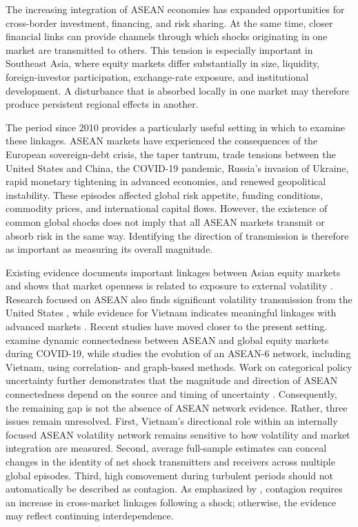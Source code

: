 \documentclass[12pt,a4paper]{article}
\begin{document}
The increasing integration of ASEAN economies has expanded opportunities for cross-border investment, financing, and risk sharing. At the same time, closer financial links can provide channels through which shocks originating in one market are transmitted to others. This tension is especially important in Southeast Asia, where equity markets differ substantially in size, liquidity, foreign-investor participation, exchange-rate exposure, and institutional development. A disturbance that is absorbed locally in one market may therefore produce persistent regional effects in another.

The period since 2010 provides a particularly useful setting in which to examine these linkages. ASEAN markets have experienced the consequences of the European sovereign-debt crisis, the taper tantrum, trade tensions between the United States and China, the COVID-19 pandemic, Russia's invasion of Ukraine, rapid monetary tightening in advanced economies, and renewed geopolitical instability. These episodes affected global risk appetite, funding conditions, commodity prices, and international capital flows. However, the existence of common global shocks does not imply that all ASEAN markets transmit or absorb risk in the same way. Identifying the direction of transmission is therefore as important as measuring its overall magnitude.

Existing evidence documents important linkages between Asian equity markets and shows that market openness is related to exposure to external volatility \citep{Chow2017}. Research focused on ASEAN also finds significant volatility transmission from the United States \citep{VoTran2020}, while evidence for Vietnam indicates meaningful linkages with advanced markets \citep{VoEllis2018}. Recent studies have moved closer to the present setting. \citet{SethapramoteEtAl2023} examine dynamic connectedness between ASEAN and global equity markets during COVID-19, while \citet{AlAnshari2025} studies the evolution of an ASEAN-6 network, including Vietnam, using correlation- and graph-based methods. Work on categorical policy uncertainty further demonstrates that the magnitude and direction of ASEAN connectedness depend on the source and timing of uncertainty \citep{HoqueEtAl2026}. Consequently, the remaining gap is not the absence of ASEAN network evidence. Rather, three issues remain unresolved. First, Vietnam's directional role within an internally focused ASEAN volatility network remains sensitive to how volatility and market integration are measured. Second, average full-sample estimates can conceal changes in the identity of net shock transmitters and receivers across multiple global episodes. Third, high comovement during turbulent periods should not automatically be described as contagion. As emphasized by \citet{ForbesRigobon2002}, contagion requires an increase in cross-market linkages following a shock; otherwise, the evidence may reflect continuing interdependence.
\end{document}
